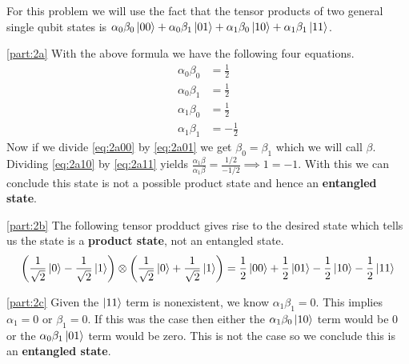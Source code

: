 \documentclass[boxes]{homework}
\begin{document}
\begin{solution}
	For this problem we will use the fact that the tensor products of two general single qubit states is $\alpha_0\beta_0\ket{00} + \alpha_0\beta_1\ket{01} + \alpha_1\beta_0\ket{10} + \alpha_1\beta_1\ket{11}$.

	\ref{part:2a}
	With the above formula we have the following four equations.
	\begin{align}
		\alpha_0\beta_0 & = \frac{1}{2} \label{eq:2a00}  \\
		\alpha_0\beta_1 & = \frac{1}{2} \label{eq:2a01}  \\
		\alpha_1\beta_0 & = \frac{1}{2} \label{eq:2a10}  \\
		\alpha_1\beta_1 & = -\frac{1}{2} \label{eq:2a11}
	\end{align}
	Now if we divide \cref{eq:2a00} by \cref{eq:2a01} we get $\beta_0 = \beta_1$ which we will call $\beta$. Dividing \cref{eq:2a10} by \cref{eq:2a11} yields $\frac{\alpha_1\beta}{\alpha_1\beta} = \frac{1/2}{-1/2} \implies 1 = -1$. With this we can conclude this state is not a possible product state and hence an \textbf{entangled state}.

	\ref{part:2b}
	The following tensor prodduct gives rise to the desired state which tells us the state is a \textbf{product state}, not an entangled state.
	\begin{equation*}
		\qty(\frac{1}{\sqrt{2}}\ket{0} - \frac{1}{\sqrt{2}}\ket{1})\otimes\qty(\frac{1}{\sqrt{2}}\ket{0} + \frac{1}{\sqrt{2}}\ket{1}) = \frac{1}{2}\ket{00} + \frac{1}{2}\ket{01} - \frac{1}{2}\ket{10} - \frac{1}{2}\ket{11}
	\end{equation*}

	\ref{part:2c}
	Given the $\ket{11}$ term is nonexistent, we know $\alpha_1\beta_1 = 0$. This implies $\alpha_1 = 0$ or $\beta_1 = 0$. If this was the case then either the $\alpha_1\beta_0\ket{10}$ term would be 0 or the $\alpha_0\beta_1\ket{01}$ term would be zero. This is not the case so we conclude this is an \textbf{entangled state}.
\end{solution}
\end{document}
